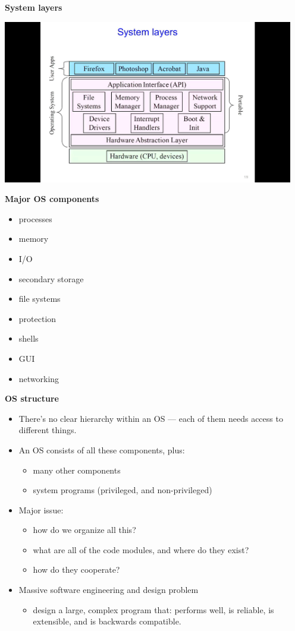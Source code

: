 \documentclass[11pt,a4paper]{article}
\begin{document}
\textbf{System layers}
\begin{center}{}
    \includegraphics[height=270]{system-layers.jpg}
\end{center}

\textbf{Major OS components}
\begin{itemize}
    \item processes
    \item memory
    \item I/O
    \item secondary storage
    \item file systems
    \item protection
    \item shells
    \item GUI
    \item networking
\end{itemize}

\textbf{OS structure}

\begin{itemize}
    \item There's no clear hierarchy within an OS --- each of them needs access to different
        things.
    \item An OS consists of all these components, plus:
        \begin{itemize}
            \item many other components
            \item system programs (privileged, and non-privileged)
        \end{itemize}
    \item Major issue:
        \begin{itemize}
            \item how do we organize all this?
            \item what are all of the code modules, and where do they exist?
            \item how do they cooperate?
        \end{itemize}
    \item Massive software engineering and design problem
        \begin{itemize}
            \item design a large, complex program that:
                performs well, is reliable, is extensible, and is backwards compatible.
        \end{itemize}
\end{itemize}
\end{document}
